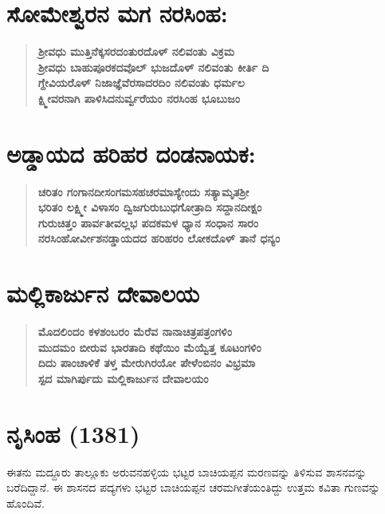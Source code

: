 \section{ಸೋಮೇಶ್ವರನ ಮಗ ನರಸಿಂಹ:}

\begin{verse}
\textbf{ಶ‍್ರೀವಧು ಮುತ್ತಿನೆಕ್ಕಸರದಂತುರದೊಳ್​ ನಲಿವಂತು ವಿಕ್ರಮ \\ ಶ‍್ರೀವಧು ಬಾಹುಪೂರಕದವೊಲ್​ ಭುಜದೊಳ್​ ನಲಿವಂತು ಕೀರ್ತಿ ದಿ \\ ಗ್ದೇವಿಯರೊಳ್​ ನಿಜಾಜ್ಞೆವೆರಸಾದರದಿಂ ನಲಿವಂತು ಧರ್ಮಲ \\ ಕ್ಷ್ಮೀವರನಾಗಿ ಪಾಳಿಸಿದನುರ್ವ್ವರೆಯಂ ನರಸಿಂಹ ಭೂಬುಜಂ}
\end{verse}


\section{ಅಡ್ಡಾಯದ ಹರಿಹರ ದಂಡನಾಯಕ:}

\begin{verse}
\textbf{ಚರಿತಂ ಗಂಗಾನದೀಸಂಗಮಸಹಚರಮಾಸ್ಯೇಂದು ಸತ್ಯಾಮೃತಶ‍್ರೀ\\ ಭರಿತಂ ಲಕ್ಷ್ಮೀ ವಿಳಾಸಂ ದ್ವಿಜಗುರುಬುಧಗೋತ್ರಾದಿ ಸದ್ದಾನದೀಕ್ಷಂ \\ ಗುರುಚಿತ್ತಂ ಪಾರ್ವತೀವಲ್ಲಭ ಪದಕಮಳ ಧ್ಯಾನ ಸಂಧಾನ ಸಾರಂ \\ ನರಸಿಂಹೋರ್ವೀಶನಡ್ಡಾಯದದ ಹರಿಹರಂ ಲೋಕದೊಳ್​ ತಾನೆ ಧನ್ಯಂ}
\end{verse}


\section{ಮಲ್ಲಿಕಾರ್ಜುನ ದೇವಾಲಯ}

\begin{verse}
\textbf{ಮೊದಲಿಂದಂ ಕಳಶಂಬರಂ ಮೆರೆವ ನಾನಾಚಿತ್ರಪತ್ರಂಗಳಿಂ \\ ಮುದಮಂ ಬೀರುವ ಭಾರತಾದಿ ಕಥೆಯಿಂ ಮೆಯ್ವೆತ್ತ ಕೂಟಂಗಳಿಂ \\ ದಿದು ಪಾಂಚಾಳಿಕೆ ತಳ್ತ ಮೇರುಗಿರಯೋ ಪೇಳೆಂಬಿನಂ ವಿಭ್ರಮಾ \\ ಸ್ಪದ ಮಾಗಿರ್ಪುದು ಮಲ್ಲಿಕಾರ್ಜುನ ದೇವಾಲಯಂ}
\end{verse}


\section{ನೃಸಿಂಹ (1381)}

ಈತನು ಮದ್ದೂರು ತಾಲ್ಲೂಕು ಅರುವನಹಳ್ಳಿಯ ಭಟ್ಟರ ಬಾಚಿಯಪ್ಪನ ಮರಣವನ್ನು ತಿಳಿಸುವ ಶಾಸನವನ್ನು ಬರೆದಿದ್ದಾನೆ. ಈ ಶಾಸನದ ಪದ್ಯಗಳು ಭಟ್ಟರ ಬಾಚಿಯಪ್ಪನ ಚರಮಗೀತೆಯಂತಿದ್ದು ಉತ್ತಮ ಕವಿತಾ ಗುಣವನ್ನು ಹೊಂದಿವೆ.

